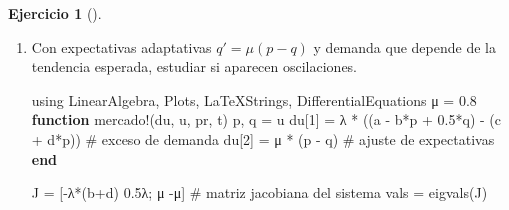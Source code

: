 \documentclass[
  spanish,
  a4paper,
]{scrreport}
\newenvironment{Shaded}{\begin{snugshade}}{\end{snugshade}}
\newcommand{\BuiltInTok}[1]{\textcolor[rgb]{0.00,0.23,0.31}{#1}}
\newcommand{\CommentTok}[1]{\textcolor[rgb]{0.37,0.37,0.37}{#1}}
\newcommand{\FloatTok}[1]{\textcolor[rgb]{0.68,0.00,0.00}{#1}}
\newcommand{\FunctionTok}[1]{\textcolor[rgb]{0.28,0.35,0.67}{#1}}
\newcommand{\ImportTok}[1]{\textcolor[rgb]{0.00,0.46,0.62}{#1}}
\newcommand{\KeywordTok}[1]{\textcolor[rgb]{0.00,0.23,0.31}{\textbf{#1}}}
\newcommand{\NormalTok}[1]{\textcolor[rgb]{0.00,0.23,0.31}{#1}}
\newcommand{\OperatorTok}[1]{\textcolor[rgb]{0.37,0.37,0.37}{#1}}
\theoremstyle{definition}
\newtheorem{exercise}{Ejercicio}[chapter]
\theoremstyle{remark}
\begin{document}
\begin{exercise}[]
\begin{enumerate}
\begin{tcolorbox}
\begin{verbatim}
(precio_equilibrio = 16.0, autovalor = -2.5)
\end{verbatim}

  El precio de equilibrio es \(p^* = (a-c)/(b+d) = 16\)€. El autovalor
  es negativo, por lo que cualquier desajuste inicial se corrige y el
  mercado converge monótonamente al equilibrio.

  \end{tcolorbox}
\item
  Con expectativas adaptativas \(q' = \mu(p - q)\) y demanda que depende
  de la tendencia esperada, estudiar si aparecen oscilaciones.

  \begin{tcolorbox}[enhanced jigsaw, arc=.35mm, bottomrule=.15mm, bottomtitle=1mm, breakable, colback=white, colbacktitle=quarto-callout-tip-color!10!white, colframe=quarto-callout-tip-color-frame, coltitle=black, left=2mm, leftrule=.75mm, opacityback=0, opacitybacktitle=0.6, rightrule=.15mm, title=\textcolor{quarto-callout-tip-color}{\faLightbulb}\hspace{0.5em}{Solución}, titlerule=0mm, toprule=.15mm, toptitle=1mm]

\begin{Shaded}
\begin{Highlighting}[]
\ImportTok{using} \BuiltInTok{LinearAlgebra}\NormalTok{, }\BuiltInTok{Plots}\NormalTok{, }\BuiltInTok{LaTeXStrings}\NormalTok{, }\BuiltInTok{DifferentialEquations}
\NormalTok{μ }\OperatorTok{=} \FloatTok{0.8}
\KeywordTok{function} \FunctionTok{mercado!}\NormalTok{(du, u, pr, t)}
\NormalTok{    p, q }\OperatorTok{=}\NormalTok{ u}
\NormalTok{    du[}\FloatTok{1}\NormalTok{] }\OperatorTok{=}\NormalTok{ λ }\OperatorTok{*}\NormalTok{ ((a }\OperatorTok{{-}}\NormalTok{ b}\OperatorTok{*}\NormalTok{p }\OperatorTok{+} \FloatTok{0.5}\OperatorTok{*}\NormalTok{q) }\OperatorTok{{-}}\NormalTok{ (c }\OperatorTok{+}\NormalTok{ d}\OperatorTok{*}\NormalTok{p))   }\CommentTok{\# exceso de demanda}
\NormalTok{    du[}\FloatTok{2}\NormalTok{] }\OperatorTok{=}\NormalTok{ μ }\OperatorTok{*}\NormalTok{ (p }\OperatorTok{{-}}\NormalTok{ q)                            }\CommentTok{\# ajuste de expectativas}
\KeywordTok{end}

\NormalTok{J }\OperatorTok{=}\NormalTok{ [}\FunctionTok{{-}λ*}\NormalTok{(b}\OperatorTok{+}\NormalTok{d)  }\FloatTok{0.5}\NormalTok{λ; μ  }\OperatorTok{{-}}\NormalTok{μ]        }\CommentTok{\# matriz jacobiana del sistema}
\NormalTok{vals }\OperatorTok{=} \FunctionTok{eigvals}\NormalTok{(J)}


\end{Highlighting}
\end{Shaded}
\end{tcolorbox}
\end{enumerate}
\end{exercise}
\end{document}
